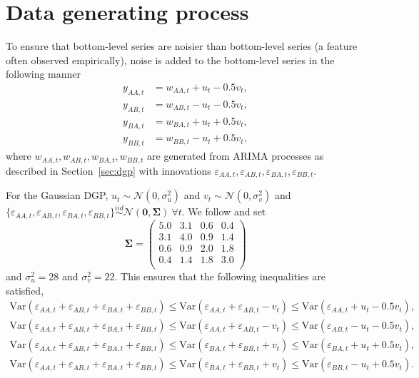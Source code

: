\documentclass[a4paper,12pt]{article}
\def\var{\text{Var}}
\theoremstyle{definition}
\begin{document}
\section{Data generating process} \label{app:DGP}

To ensure that bottom-level series are noisier than bottom-level series (a feature often observed empirically), noise is added to the bottom-level series in the following manner
\begin{align*}
y_{AA,t} &= w_{AA,t} + u_t - 0.5v_t,\\
y_{AB,t} &= w_{AB,t} - u_t - 0.5v_t,\\
y_{BA,t} &= w_{BA,t} + u_t + 0.5v_t,\\
y_{BB,t} &= w_{BB,t} - u_t + 0.5v_t,
\end{align*}
where $w_{AA,t},w_{AB,t},w_{BA,t},w_{BB,t}$ are generated from ARIMA processes as described in Section~\ref{sec:dgp} with innovations $\varepsilon_{AA,t},\varepsilon_{AB,t},\varepsilon_{BA,t},\varepsilon_{BB,t}$.

For the Gaussian DGP, $u_t \sim \mathcal{N}(0,\sigma^2_u)$ and $v_t \sim \mathcal{N}(0,\sigma^2_v)$ and $\{\varepsilon_{AA,t},\varepsilon_{AB,t},\varepsilon_{BA,t},\varepsilon_{BB,t}\} \overset{iid}{\sim} \mathcal{N}(\bm{0}, \bm{\Sigma})~\forall t$. We follow \cite{WicEtAl2019} and set
\begin{equation*}\label{eq:SigmaGaussian}
\bm{\Sigma} =
\begin{pmatrix}
5.0 & 3.1 & 0.6 & 0.4 \\
3.1 & 4.0 & 0.9 & 1.4 \\
0.6 & 0.9 & 2.0 & 1.8 \\
0.4 & 1.4 & 1.8 & 3.0 \\
\end{pmatrix}
\end{equation*} and $\sigma^2_u=28$ and $\sigma^2_v=22$. This ensures that the following inequalities are satisfied,
\begin{align*}
\var(\varepsilon_{AA,t} + \varepsilon_{AB,t} + \varepsilon_{BA,t} + \varepsilon_{BB,t})
\le \var(\varepsilon_{AA,t}+\varepsilon_{AB,t}-v_t)
\le \var(\varepsilon_{AA,t}+u_t-0.5v_t),\\
\var(\varepsilon_{AA,t} + \varepsilon_{AB,t} + \varepsilon_{BA,t} + \varepsilon_{BB,t})
\le \var(\varepsilon_{AA,t}+\varepsilon_{AB,t}-v_t)
\le \var(\varepsilon_{AB,t}-u_t-0.5v_t),\\
\var(\varepsilon_{AA,t} + \varepsilon_{AB,t} + \varepsilon_{BA,t} + \varepsilon_{BB,t})
\le \var(\varepsilon_{BA,t}+\varepsilon_{BB,t}+v_t)
\le \var(\varepsilon_{BA,t}+u_t+0.5v_t),\\
\var(\varepsilon_{AA,t} + \varepsilon_{AB,t} + \varepsilon_{BA,t} + \varepsilon_{BB,t})
\le \var(\varepsilon_{BA,t}+\varepsilon_{BB,t}+v_t)
\le \var(\varepsilon_{BB,t}-u_t+0.5v_t).\\
\end{align*}
\end{document}
